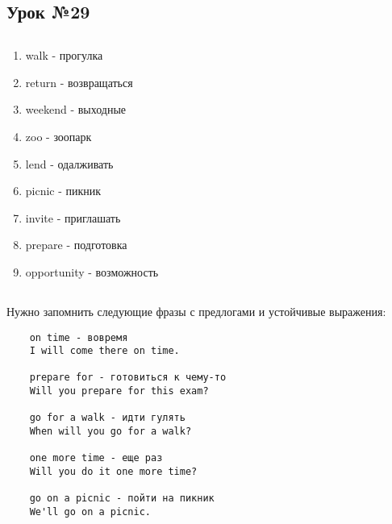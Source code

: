 \subsection{Урок №29}

\subsection*{}
\begin{multicols}{2}
    \begin{enumerate}\setlength{\itemsep}{0pt}
        \item walk - прогулка
        \item return - возвращаться
        \item weekend - выходные
        \item zoo - зоопарк
        \item lend - одалживать
        \item picnic - пикник
        \item invite - приглашать
        \item prepare - подготовка
        \item opportunity - возможность
    \end{enumerate}
\end{multicols}

\subsection*{}
Нужно запомнить следующие фразы с предлогами и устойчивые выражения:
\begin{verbatim}
    on time - вовремя
    I will come there on time.

    prepare for - готовиться к чему-то
    Will you prepare for this exam?

    go for a walk - идти гулять
    When will you go for a walk?

    one more time - еще раз
    Will you do it one more time?

    go on a picnic - пойти на пикник
    We'll go on a picnic.
\end{verbatim}